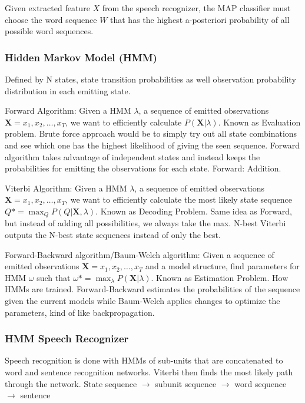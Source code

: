 Given extracted feature  $ X $ from the speech recognizer, the MAP classifier must choose the word sequence $ W $
that has the highest a-posteriori probability of all possible word sequences.

\subsubsection{Hidden Markov Model (HMM)}
Defined by N states, state transition probabilities as well observation probability distribution in each emitting state.

Forward Algorithm: Given a HMM $ \lambda $, a sequence of emitted observations $ \textbf{X} = x_1, x_2, \ldots, x_T $,
we want to efficiently calculate $ P(\textbf{X} | \lambda) $. Known as Evaluation problem.
Brute force approach would be to simply try out all state combinations and see which one has the highest likelihood of giving the seen sequence.
Forward algorithm takes advantage of independent states and instead keeps the probabilities for emitting the observations for each state. Forward: Addition.

Viterbi Algorithm: Given a HMM $ \lambda $, a sequence of emitted observations $ \textbf{X} = x_1, x_2, \ldots, x_T $,
we want to efficiently calculate the most likely state sequence $ Q* = \max_Q P(Q | \textbf{X}, \lambda) $.
Known as Decoding Problem. Same idea as Forward, but instead of adding all possibilities, we always take the max.
N-best Viterbi outputs the N-best state sequences instead of only the best.

Forward-Backward algorithm/Baum-Welch algorithm: Given a sequence of emitted observations $ \textbf{X} = x_1, x_2, \ldots, x_T $ and a model structure,
find parameters for HMM $ \omega $ such that $ \omega* = \max_{\lambda} P(\textbf{X} | \lambda) $.
Known as Estimation Problem. How HMMs are trained.
Forward-Backward estimates the probabilities of the sequence given the current models while Baum-Welch applies changes to optimize the parameters,
kind of like backpropagation.

\subsubsection{HMM Speech Recognizer}
Speech recognition is done with HMMs of sub-units that are concatenated to word and sentence recognition networks.
Viterbi then finds the most likely path through the network.
State sequence $ \xrightarrow{} $ subunit sequence $ \xrightarrow{} $ word sequence $ \xrightarrow{} $ sentence


